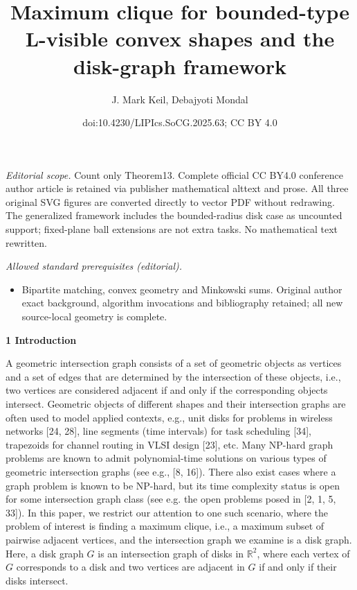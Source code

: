 \documentclass[10pt,a4paper]{amsart}
\title{Maximum clique for bounded-type L-visible convex shapes and the disk-graph framework}
\author{J. Mark Keil, Debajyoti Mondal}
\date{doi:10.4230/LIPIcs.SoCG.2025.63; CC BY 4.0}
\begin{document}
\maketitle
\noindent\textit{Editorial scope.} Count only Theorem13. Complete official CC BY4.0 conference author article is retained via publisher mathematical alttext and prose. All three original SVG figures are converted directly to vector PDF without redrawing. The generalized framework includes the bounded-radius disk case as uncounted support; fixed-plane ball extensions are not extra tasks. No mathematical text rewritten.\par\medskip
\noindent\textit{Allowed standard prerequisites (editorial).}\begin{itemize}
\item Bipartite matching, convex geometry and Minkowski sums. Original author exact background, algorithm invocations and bibliography retained; all new source-local geometry is complete.
\end{itemize}\medskip
\par\medskip\noindent\textbf{1 Introduction}\par
A geometric intersection graph consists of a set of geometric objects as vertices and a set of edges that are determined by the intersection of these objects, i.e., two vertices are considered adjacent if and only if the corresponding objects intersect. Geometric objects of different shapes and their intersection graphs are often used to model applied contexts, e.g., unit disks for problems in wireless networks [24, 28], line segments (time intervals) for task scheduling [34], trapezoids for channel routing in VLSI design [23], etc. Many NP-hard graph problems are known to admit polynomial-time solutions on various types of geometric intersection graphs (see e.g., [8, 16]). There also exist cases where a graph problem is known to be NP-hard, but its time complexity status is open for some intersection graph class (see e.g. the open problems posed in [2, 1, 5, 33]). In this paper, we restrict our attention to one such scenario, where the problem of interest is finding a maximum clique, i.e., a maximum subset of pairwise adjacent vertices, and the intersection graph we examine is a disk graph. Here, a disk graph $G$ is an intersection graph of disks in $\mathbb{R}^{2}$, where each vertex of $G$ corresponds to a disk and two vertices are adjacent in $G$ if and only if their disks intersect.
\par
\par
\end{document}
